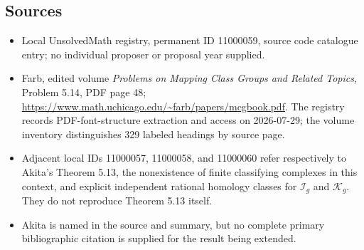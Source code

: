 \documentclass[11pt]{article}
\begin{document}
\subsection{Sources}
\begin{itemize}
\item Local UnsolvedMath registry, permanent ID 11000059, source code catalogue entry; no individual proposer or proposal year supplied.
\item Farb, edited volume \emph{Problems on Mapping Class Groups and Related Topics}, Problem 5.14, PDF page 48; \url{https://www.math.uchicago.edu/~farb/papers/mcgbook.pdf}. The registry records PDF-font-structure extraction and access on 2026-07-29; the volume inventory distinguishes 329 labeled headings by source page.
\item Adjacent local IDs 11000057, 11000058, and 11000060 refer respectively to Akita's Theorem 5.13, the nonexistence of finite classifying complexes in this context, and explicit independent rational homology classes for $\mathcal I_g$ and $\mathcal K_g$. They do not reproduce Theorem 5.13 itself.
\item Akita is named in the source and summary, but no complete primary bibliographic citation is supplied for the result being extended.
\end{itemize}
\end{document}
